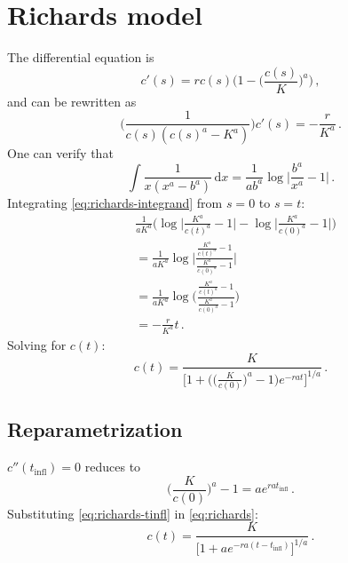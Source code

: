 \documentclass[12pt]{article}
\begin{document}
\section{Richards model}

The differential equation is
%
\begin{equation}
  c'(s) = r c(s) \bigg(1 - \bigg(\frac{c(s)}{K}\bigg)^a\bigg)\,,
\end{equation}
%
and can be rewritten as
%
\begin{equation}
  \label{eq:richards-integrand}
  \bigg(\frac{1}{c(s) (c(s)^a - K^a)}\bigg) c'(s) = -\frac{r}{K^a}\,.
\end{equation}
%
One can verify that
%
\begin{equation}
  \int \frac{1}{x (x^a - b^a)}\,\text{d}x = \frac{1}{a b^a} \log\bigg|\frac{b^a}{x^a} - 1\bigg|\,.
\end{equation}
%
Integrating \eqref{eq:richards-integrand} from $s = 0$ to $s = t$:
%
\begin{equation}
  \begin{aligned}
    &\frac{1}{a K^a} \Bigg(\log\bigg|\frac{K^a}{c(t)^a} - 1\bigg| - \log\bigg|\frac{K^a}{c(0)^a} - 1\bigg|\Bigg) \\
    &= \frac{1}{a K^a} \log\Bigg|\frac{\frac{K^a}{c(t)^a} - 1}{\frac{K^a}{c(0)^a} - 1}\Bigg| \\
    &= \frac{1}{a K^a} \log\Bigg(\frac{\frac{K^a}{c(t)^a} - 1}{\frac{K^a}{c(0)^a} - 1}\Bigg) \\
    &= -\frac{r}{K^a}t\,.
  \end{aligned}
\end{equation}
%
Solving for $c(t)$:
%
\begin{equation}
  \label{eq:richards}
  c(t) = \frac{K}{\big[1 + \big(\big(\frac{K}{c(0)}\big)^a - 1\big) e^{-r a t}\big]^{1/a}}\,.
\end{equation}

\subsection{Reparametrization}

$c''(t_\text{infl}) = 0$ reduces to
%
\begin{equation}
  \label{eq:richards-tinfl}
  \bigg(\frac{K}{c(0)}\bigg)^a - 1 = a e^{r a t_\text{infl}}\,.
\end{equation}
%
Substituting \eqref{eq:richards-tinfl} in \eqref{eq:richards}:
%
\begin{equation}
  c(t) = \frac{K}{\big[1 + a e^{-r a (t - t_\text{infl})}\big]^{1/a}}\,.
\end{equation}
\end{document}
